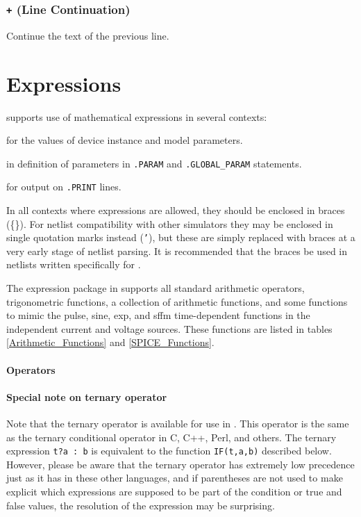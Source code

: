 \subsubsection{\texttt{+} (Line Continuation)}
 Continue the text of the previous line.

\newpage
\section{Expressions}
\label{ExpressionDocumentation}
\Xyce{} supports use of mathematical expressions in several contexts:
\begin{XyceItemize}
\item for the values of device instance and model parameters.
\item in definition of parameters in \texttt{.PARAM} and \texttt{.GLOBAL\_PARAM} statements.
\item for output on \texttt{.PRINT} lines.
\end{XyceItemize}

In all contexts where expressions are allowed, they should be enclosed
in braces (\{\}).  For netlist compatibility with other simulators
they may be enclosed in single quotation marks instead (\texttt{'}),
but these are simply replaced with braces at a very early stage of
netlist parsing.  It is recommended that the braces be used in
netlists written specifically for \Xyce{}.

The expression package in \Xyce{} supports all standard arithmetic
operators, trigonometric functions, a collection of arithmetic
functions, and some functions to mimic the pulse, sine, exp, and sffm
time-dependent functions in the independent current and voltage sources.
These functions are listed in tables \ref{Arithmetic_Functions} and
\ref{SPICE_Functions}.

\paragraph{Operators}


\paragraph{Special note on ternary operator}
Note that the ternary operator is available for use in \Xyce{}.  This
operator is the same as the ternary conditional operator in C, C++,
Perl, and others.  The ternary expression \texttt{t?a : b} is
equivalent to the function \texttt{IF(t,a,b)} described below.
However, please be aware that the ternary operator has extremely low
precedence just as it has in these other languages, and if parentheses
are not used to make explicit which expressions are supposed to be
part of the condition or true and false values, the resolution of the
expression may be surprising.

